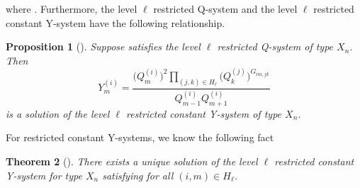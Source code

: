 \documentclass[10pt,a4paper]{amsart}
\numberwithin{equation}{section}
\newtheorem{Theorem}{Theorem}[section]
\newtheorem{Proposition}[Theorem]{Proposition}
\newcommand{\R}{{\mathbb R}}
\begin{document}
where .
Furthermore, the level $\ell$ restricted Q-system and the level $\ell$ restricted constant Y-system have the following relationship.
	\begin{Proposition}[{\cite[Proposition 14.1]{KNS}}]\label{QY}
	Suppose  satisfies the level $\ell$ restricted Q-system of type $X_n$.
	Then
		\[Y_m^{(i)}=\frac{\bigl(Q_m^{(i)}\bigr)^2\prod_{(j,k)\in H_\ell}\bigl(Q_k^{(j)}\bigr)^{G_{im,jk}}}{Q_{m-1}^{(i)}Q_{m+1}^{(i)}}\]
	is a solution of the level $\ell$ restricted constant Y-system of type $X_n$.
	\end{Proposition}
For restricted constant Y-systems, we know the following fact
	\begin{Theorem}[{\cite{IIKKN, IIKKN2, KN}}]\label{Ysol}
	There exists a unique solution of the level $\ell$ restricted constant Y-system for type $X_n$ satisfying \smash{$Y_m^{(i)}\in\R_{\geq0}$} for all $(i,m)\in H_\ell$.
	\end{Theorem}
	
\end{document}
